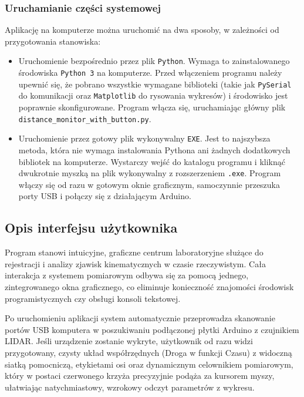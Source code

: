 \documentclass[a4paper,12pt]{article}
\begin{document}
\subsubsection{Uruchamianie części systemowej}

Aplikację na komputerze można uruchomić na dwa sposoby, w zależności od przygotowania stanowiska:

\begin{itemize}
    \item Uruchomienie bezpośrednio przez plik \texttt{Python}. Wymaga to zainstalowanego środowiska \texttt{Python 3} na komputerze. Przed włączeniem programu należy upewnić się, że pobrano wszystkie wymagane biblioteki (takie jak \texttt{PySerial} do komunikacji oraz \texttt{Matplotlib} do rysowania wykresów) i środowisko jest poprawnie skonfigurowane. Program włącza się, uruchamiając główny plik \texttt{distance\_monitor\_with\_button.py}.
    \item Uruchomienie przez gotowy plik wykonywalny \texttt{EXE}. Jest to najszybsza metoda, która nie wymaga instalowania Pythona ani żadnych dodatkowych bibliotek na komputerze. Wystarczy wejść do katalogu programu i kliknąć dwukrotnie myszką na plik wykonywalny z rozszerzeniem \texttt{.exe}. Program włączy się od razu w gotowym oknie graficznym, samoczynnie przeszuka porty USB i połączy się z działającym Arduino.
\end{itemize}



\subsection{Opis interfejsu użytkownika}

Program stanowi intuicyjne, graficzne centrum laboratoryjne służące do rejestracji i analizy zjawisk kinematycznych w czasie rzeczywistym. Cała interakcja z systemem pomiarowym odbywa się za pomocą jednego, zintegrowanego okna graficznego, co eliminuje konieczność znajomości środowisk programistycznych czy obsługi konsoli tekstowej. 

\vspace{0.3cm}
\noindent Po uruchomieniu aplikacji system automatycznie przeprowadza skanowanie portów USB komputera w poszukiwaniu podłączonej płytki Arduino z czujnikiem LIDAR. Jeśli urządzenie zostanie wykryte, użytkownik od razu widzi przygotowany, czysty układ współrzędnych (Droga w funkcji Czasu) z widoczną siatką pomocniczą, etykietami osi oraz dynamicznym celownikiem pomiarowym, który w postaci czerwonego krzyża precyzyjnie podąża za kursorem myszy, ułatwiając natychmiastowy, wzrokowy odczyt parametrów z wykresu. 
\end{document}
